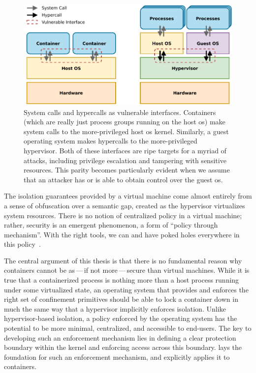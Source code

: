 \begin{figure}[htbp]
  \centering
  \includegraphics[width=0.8\linewidth]{figs/confinement-problem/syscall-hypercall.pdf}
  \caption[System calls and hypercalls as vulnerable interfaces]{
    System calls and hypercalls as vulnerable interfaces. Containers (which are really
    just process groups running on the host \gls{os}) make system calls to the
    more-privileged host \gls{os} kernel. Similarly, a guest operating system makes
    hypercalls to the more-privileged hypervisor. Both of these interfaces are ripe
    targets for a myriad of attacks, including privilege escalation and tampering with
    sensitive resources. This parity becomes particularly evident when we assume that an
    attacker has or is able to obtain control over the guest \gls{os}.
  }%
  \label{fig:syscall-hypercall}
\end{figure}

The isolation guarantees provided by a virtual machine come almost entirely from a sense
of obfuscation over a semantic gap, created as the hypervisor virtualizes system
resources. There is no notion of centralized policy in a virtual machine; rather, security
is an emergent phenomenon, a form of \enquote{policy through mechanism}. With the right
tools, we can and have poked holes everywhere in this
policy~\cite{dubrelle2015_hypervisor, thongthua2016_analysis, shahzad2017_systematic}.

The central argument of this thesis is that there is no fundamental reason why containers
cannot be as\,---\,if not more\,---\,secure than virtual machines. While it is true that
a containerized process is nothing more than a host process running under some virtualized
state, an operating system that provides and enforces the right set of confinement
primitives should be able to lock a container down in much the same way that a hypervisor
implicitly enforces isolation. Unlike hypervisor-based isolation, a policy enforced by the
operating system has the potential to be more minimal, centralized, and accessible to
end-users. The key to developing such an enforcement mechanism lies in defining a clear
protection boundary within the kernel and enforcing access across this boundary. \bpfbox{}
lays the foundation for such an enforcement mechanism, and \bpfcontain{} explicitly
applies it to containers.

